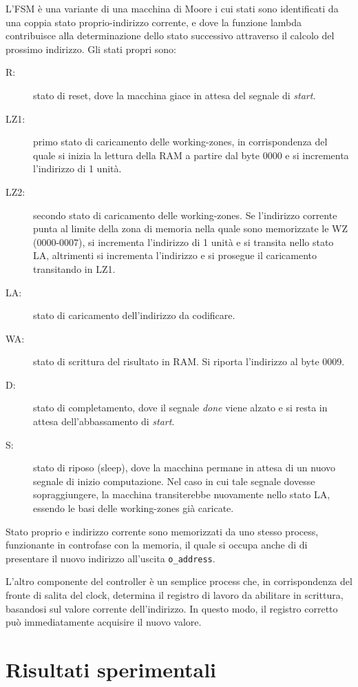 \documentclass[11pt,a4paper]{article}
\begin{document}
L'FSM è una variante di una macchina di Moore i cui stati sono identificati da una coppia stato proprio-indirizzo corrente, e dove la funzione lambda
contribuisce alla determinazione dello stato successivo attraverso il calcolo del prossimo indirizzo. Gli stati propri sono:
\begin{description}
    \item[R:] stato di reset, dove la macchina giace in attesa del segnale di \emph{start}.
    \item[LZ1:] primo stato di caricamento delle working-zones, in corrispondenza del quale si inizia la lettura della RAM a partire dal byte 0000 e si
        incrementa l'indirizzo di 1 unità.
    \item[LZ2:] secondo stato di caricamento delle working-zones. Se l'indirizzo corrente punta al limite della zona di memoria nella quale sono
        memorizzate le WZ (0000-0007), si incrementa l'indirizzo di 1 unità e si transita nello stato LA, altrimenti si incrementa l'indirizzo e si
        prosegue il caricamento transitando in LZ1.
    \item[LA:] stato di caricamento dell'indirizzo da codificare.
    \item[WA:] stato di scrittura del risultato in RAM. Si riporta l'indirizzo al byte 0009.
    \item[D:] stato di completamento, dove il segnale \emph{done} viene alzato e si resta in attesa dell'abbassamento di \emph{start}.
    \item[S:] stato di riposo (sleep), dove la macchina permane in attesa di un nuovo segnale di inizio computazione. Nel caso in cui tale segnale dovesse
        sopraggiungere, la macchina transiterebbe nuovamente nello stato LA, essendo le basi delle working-zones già caricate.
\end {description}
Stato proprio e indirizzo corrente sono memorizzati da uno stesso process, funzionante in controfase con la memoria, il quale si occupa anche di di
presentare il nuovo indirizzo all'uscita \lstinline{o_address}.

L'altro componente del controller è un semplice process che, in corrispondenza del fronte di salita del clock, determina il registro di lavoro da abilitare
in scrittura, basandosi sul valore corrente dell'indirizzo. In questo modo, il registro corretto può immediatamente acquisire il nuovo valore.

\section{Risultati sperimentali}
\end{document}
